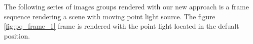 The following series of images groups rendered with our new approach is a frame sequence rendering a scene with moving point light source. The figure \ref{fig:pq_frame_1} frame is rendered with the point light located in the defualt position.  

\begin{figure}\label{fig:result_images}
\begin{center}
\setlength{\tabcolsep}{0mm}
%
\end{center}
\end{figure}
